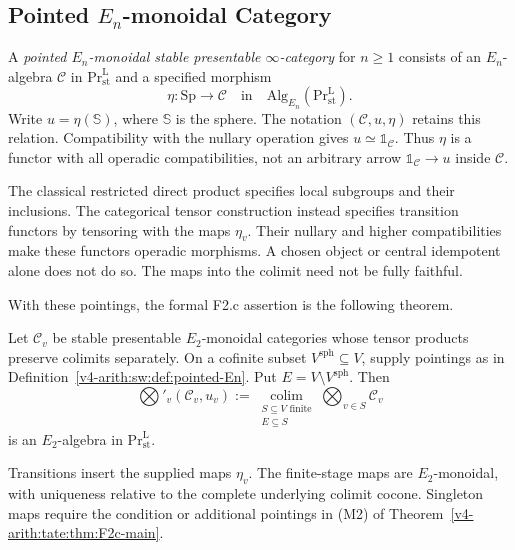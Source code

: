 \subsection{Pointed \(E_{n}\)-monoidal Category}

\begin{definition}
\label{v4-arith:sw:def:pointed-En}
A \emph{pointed \(E_{n}\)-monoidal stable presentable \(\infty\)-category}
for \(n\geq1\) consists of an \(E_n\)-algebra \(\mathcal C\) in
\(\mathrm{Pr}^{\mathrm L}_{\mathrm{st}}\) and a specified morphism
\[
 \eta:\mathrm{Sp}\longrightarrow\mathcal C
 \quad\text{in}\quad
 \mathrm{Alg}_{E_n}(\mathrm{Pr}^{\mathrm L}_{\mathrm{st}}).
\]
Write \(u=\eta(\mathbb S)\), where \(\mathbb S\) is the sphere.
The notation \((\mathcal C,u,\eta)\) retains this relation.
Compatibility with the nullary operation gives
\(u\simeq\mathbb1_{\mathcal C}\). Thus \(\eta\) is a functor with
all operadic compatibilities, not an arbitrary arrow
\(\mathbb1_{\mathcal C}\to u\) inside \(\mathcal C\).
\end{definition}

\begin{remark}
\label{v4-arith:sw:rem:why-pointed}
The classical restricted direct product specifies local subgroups
and their inclusions. The categorical tensor construction instead
specifies transition functors by tensoring with the maps \(\eta_v\).
Their nullary and higher compatibilities make these functors
operadic morphisms. A chosen object or central idempotent alone
does not do so. The maps into the colimit need not be fully faithful.
\end{remark}

With these pointings, the formal F2.c assertion is the following theorem.

\begin{theorem}
\label{v4-arith:sw:conj:F2c-tightened}
Let \(\mathcal C_v\) be stable presentable \(E_2\)-monoidal categories
whose tensor products preserve colimits separately. On a cofinite
subset \(V^{\mathrm{sph}}\subseteq V\), supply pointings as in
Definition~\ref{v4-arith:sw:def:pointed-En}. Put
\(E=V\setminus V^{\mathrm{sph}}\). Then
\[
 \bigotimes'_v(\mathcal C_v,u_v)
 :=\operatorname*{colim}_{\substack{S\subseteq V\text{ finite}\\E\subseteq S}}
       \bigotimes_{v\in S}\mathcal C_v
\]
is an \(E_2\)-algebra in \(\mathrm{Pr}^{\mathrm L}_{\mathrm{st}}\).

Transitions insert the supplied maps \(\eta_v\).
The finite-stage maps are \(E_2\)-monoidal, with uniqueness
relative to the complete underlying colimit cocone. Singleton
maps require the condition or additional pointings in (M2) of
Theorem~\ref{v4-arith:tate:thm:F2c-main}.
\end{theorem}

